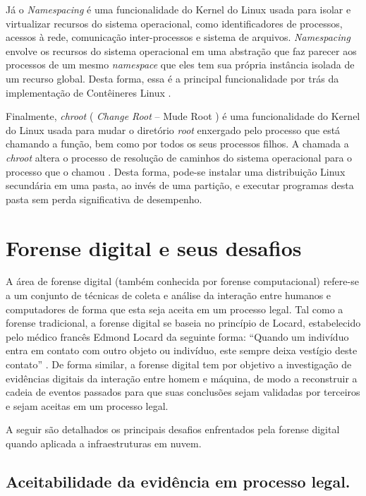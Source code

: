 Já o \textit{Namespacing} é uma funcionalidade do Kernel do Linux usada para isolar e virtualizar recursos do sistema operacional, como identificadores de processos, acessos à rede, comunicação inter-processos e sistema de arquivos.
%
\textit{Namespacing} envolve os recursos do sistema operacional em uma abstração que faz parecer aos processos de um mesmo \textit{namespace} que eles tem sua própria instância isolada de um recurso global.
%
Desta forma, essa é a principal funcionalidade por trás da implementação de Contêineres Linux \cite{UnixManPagesNamespacing}.


Finalmente, \textit{chroot} ( \textit{Change Root} -- Mude Root ) é uma funcionalidade do Kernel do Linux usada para mudar o diretório \textit{root} enxergado pelo processo que está chamando a função, bem como por todos os seus processos filhos. 
%
A chamada a \textit{chroot} altera o processo de resolução de caminhos do sistema operacional para o processo que o chamou \cite{UnixManPagesChRoot}.
%
Desta forma, pode-se instalar uma distribuição Linux secundária em uma pasta, ao invés de uma partição, e executar programas desta pasta sem perda significativa de desempenho.


\section{Forense digital e seus desafios}
\label{sec:forensedigital}


A área de forense digital (também conhecida por forense computacional) refere-se a um conjunto de técnicas de coleta e análise da interação entre humanos e computadores de forma que esta seja aceita em um processo legal.
%
Tal como a forense tradicional, a forense digital se baseia no princípio de Locard, estabelecido pelo médico francês Edmond Locard da seguinte forma: ``Quando um indivíduo entra em contato com outro objeto ou indivíduo, este sempre deixa vestígio deste contato'' \cite{Ramos:2011}.
%
De forma similar, a forense digital tem por objetivo a investigação de evidências digitais da interação entre homem e máquina, de modo a reconstruir a cadeia de eventos passados para que suas conclusões sejam validadas por terceiros e sejam aceitas em um processo legal.
 

A seguir são detalhados os principais desafios enfrentados pela forense digital quando aplicada a infraestruturas em nuvem.

\subsection{Aceitabilidade da evidência em processo legal.}
\label{sec:credibilidadeaceitabilidadeevidencia}

